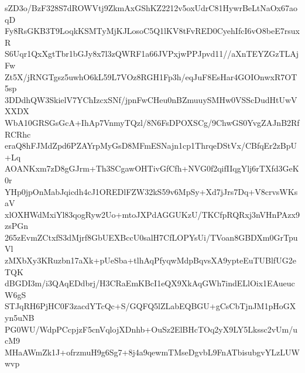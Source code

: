 sZD3o/BzF328S7dROWVtj9ZkmAxGShKZ2212v5oxUdrC81HywrBeLtNaOx67aoqD
Fy8RsGKB3T9LoqkKSMTyMjKJLosoC5Q1lKV8tFvRED0CyehIfcI6vO8beE7rsuxR
S6Uqr1QxXgtTbr1bGJy8x7l3zQWRF1a66JVPxjwPPJpvd11//aXnTEYZGzTLAjFw
Zt5X/jRNGTgsz5uwhO6kL59L7VOz8RGH1Fp3h/eqJuF8EsHar4GOIOnwxR7OT5sp
3DDdhQW3SkielV7YChIzcxSNf/jpnFwCHeu0nBZmuuySMHw0VSScDudHtUwVXXDX
WbA10GRSGsGcA+IhAp7VnmyTQzl/8N6FsDPOXSCg/9ChwGS0YvgZAJnB2RfRCRhc
eraQ8hFJMdZpd6PZAYrpMyGsD8MFmESNajn1cp1ThrqeDStVx/CBfqEr2zBpU+Lq
AOANKxm7zD8gGJrm+Th3SCgawOHTivGfCfh+NVG0f2qifIIqgYlj6rTXfd3GeK0r
YHp0jpOnMabJqicdh4cJ1OREDlFZW32kS59v6MpSy+Xd7jJrs7Dq+V8crvsWKsaV
xlOXHWdMxiYl83qogRyw2Uo+mtoJXPdAGGUKzU/TKCfpRQRxj3nVHnPAzx9zsPGn
265zEvmZCtxfS3dMjrf8GbUEXBccU0salH7CfLOPYsUi/TVoan8GBDXm0GrTpuVl
zMXbXy3KRuzbn17aXk+pUeSba+tlhAqPfyqwMdpBqvsXA9ypteEuTUBlfUG2eTQK
dBGDI3m/i3QAqEDdbrj/H3CRaEmKBcI1eQX9XkAqGWh7indELlOix1EAueucW6gS
STJqRH6PjHC0F3zacdYTcQc+S/GQFQ5lZLabEQBGU+gCsCbTjnJM1pHoGXyn5uNB
PG0WU/WdpPCcpjzF5cnVqlojXDnhb+OuSz2ElBHcTOq2yX9LY5Lkssc2vUm/ucM9
MHaAWmZk1J+ofrzmuH9g6Sg7+8j4a9qewmTMseDgvbL9FnATbisubgvYLzLUWwvp
